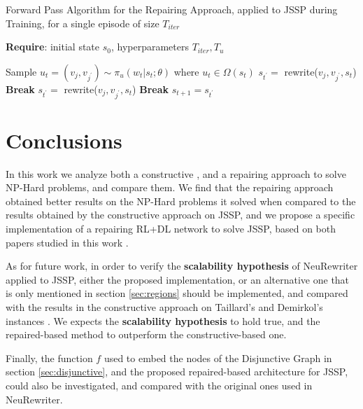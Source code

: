 \documentclass[12pt]{article}
\begin{document}
\label{alg:forward_jssp}
\begin{algorithm}[H]
    \caption{Forward Pass Algorithm for the Repairing Approach, applied to JSSP during Training, for a single episode of size $T_{iter}$}
    \textbf{Require}: initial state $s_0$, hyperparameters $T_{iter}, T_u$
    \begin{algorithmic}[1]
            \State Sample $u_t = (v_j,v_{j^{'}}) \sim \pi_{u}(w_t|s_t;\theta)$ where $u_t \in \Omega(s_t)$
            \State $s_{t^{'}}=$ rewrite($v_j,v_{j^{'}},s_t$)
                \textbf{Break}
            \EndIf
        \EndFor
        \State $s_{t^{'}}=$ rewrite($v_j,v_{j^{'}},s_t$) 
           
            \State \textbf{Break}
        \EndIf
        \State $s_{t+1} = s_{t^{'}}$
    \EndFor
    
    \end{algorithmic}
    \end{algorithm}



\section{Conclusions}
In this work we analyze both a constructive \cite{pierre_constructive_approach}, and a repairing approach \cite{neu_rewriter} to solve NP-Hard problems, and compare 
them. 
We find that the repairing approach obtained better results on the NP-Hard problems it solved when compared to the results obtained by the constructive approach on JSSP, and
 we propose a specific implementation of a repairing RL+DL network to solve JSSP, based on both papers studied in this work \cite{pierre_constructive_approach}\cite{neu_rewriter}.

 \medbreak
As for future work, in order to verify the \textbf{scalability hypothesis} of NeuRewriter applied to JSSP, either the proposed implementation, or an alternative one 
that is only mentioned in section \ref{sec:regions} should be implemented, and compared with the results in the constructive approach \cite{pierre_constructive_approach} on Taillard's and Demirkol's instances \cite{taillard}.
We expects the \textbf{scalability hypothesis} to hold true, and the repaired-based method to outperform the constructive-based one.

Finally, the function $f$ used to embed the nodes of the Disjunctive Graph in section \ref{sec:disjunctive}, and the proposed repaired-based architecture for JSSP, could also be investigated,
 and compared with the original ones used in NeuRewriter.
\end{document}
